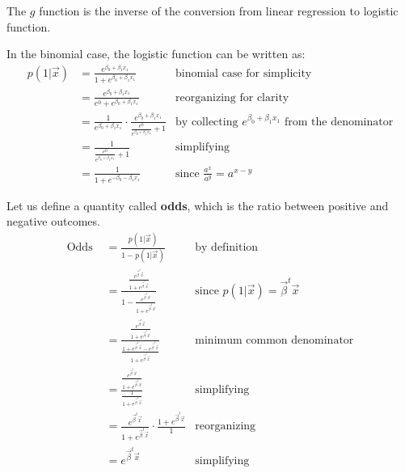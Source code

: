     The $g$ function is the inverse of the conversion from linear regression to logistic function.
    
    In the binomial case, the logistic function can be written as:
	\begin{align*}
	  p(1|\vec{x}) & = \frac{e^{\beta_0 + \beta_1 x_1}} {1+e^{\beta_0 + \beta_1 x_1}}
	               & \text{binomial case for simplicity} \\
	               & = \frac{e^{\beta_0 + \beta_1 x_1}} {e^0+e^{\beta_0 + \beta_1 x_1}}
	               & \text{reorganizing for clarity} \\
	               & = \frac{1}{e^{\beta_0 + \beta_1 x_1}} \cdot \frac{e^{\beta_0 + \beta_1 x_1}}{\frac{e^0}{e^{\beta_0 + \beta_1 x_1}} + 1}
	               & \text{by collecting } e^{\beta_0 + \beta_1 x_1} \text{ from the denominator}\\
	               & = \frac{1}{\frac{e^0}{e^{\beta_0 + \beta_1 x_1}} + 1} 
	               & \text{simplifying}\\ 
	               & = \frac{1}{1 + e^{-\beta_0 - \beta_1 x_1}}
	               & \text{since } \frac{a^x}{a^y} = a^{x-y}
	\end{align*}

	
    Let us define a quantity called \textbf{odds}, which is the ratio between positive and negative outcomes.
	\begin{align*}
	  \text{Odds } &= \frac{p(1|\vec{x})}{1 - p(1|\vec{x})}
	               & \text{by definition}\\
	               &= \frac{\frac{e^{\vec{\beta}^t\vec{x}}}{1 + e^{\vec{\beta}^t\vec{x}}}}
	                       {1 - \frac{e^{\vec{\beta}^t\vec{x}}}{1 + e^{\vec{\beta}^t\vec{x}}}}
	               & \text{since } p(1|\vec{x}) = \vec{\beta}^t\vec{x} \\
	               &= \frac{\frac{e^{\vec{\beta}^t\vec{x}}}{1 + e^{\vec{\beta}^t\vec{x}}}}
	                       {\frac{1 + e^{\vec{\beta}^t\vec{x}} - e^{\vec{\beta}^t\vec{x}}}{1 + e^{\vec{\beta}^t\vec{x}}}}
	               & \text{minimum common denominator}\\
	               &= \frac{\frac{e^{\vec{\beta}^t\vec{x}}}{1 + e^{\vec{\beta}^t\vec{x}}}}
	                       {\frac{1}{1 + e^{\vec{\beta}^t\vec{x}}}}
	               & \text{simplifying}\\
	               &= \frac{e^{\vec{\beta}^t\vec{x}}}{1 + e^{\vec{\beta}^t\vec{x}}} \cdot
	                       \frac{1 + e^{\vec{\beta}^t\vec{x}}}{1}
	               & \text{reorganizing}\\
	               &= e^{\vec{\beta}^t\vec{x}}
	               & \text{simplifying}\\
	\end{align*}
    
